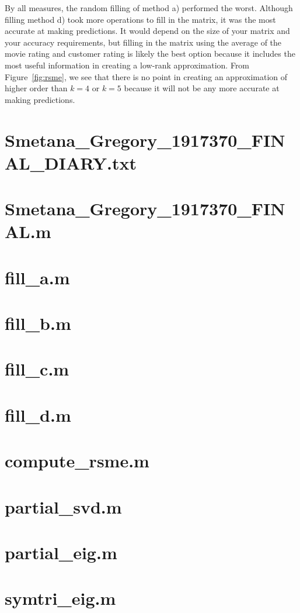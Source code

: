 \documentclass[11pt]{article} %
\begin{document}
By all measures, the random filling of method a) performed the worst. Although filling method d) took more operations to fill in the matrix, it was the most accurate at making predictions. It would depend on the size of your matrix and your accuracy requirements, but filling in the matrix using the average of the movie rating and customer rating is likely the best option because it includes the most useful information in creating a low-rank approximation. From Figure~\ref{fig:rsme}, we see that there is no point in creating an approximation of higher order than $k=4$ or $k=5$ because it will not be any more accurate at making predictions.

\clearpage
\appendix


\section{Smetana\_Gregory\_1917370\_FINAL\_DIARY.txt}


\section{Smetana\_Gregory\_1917370\_FINAL.m}


\section{fill\_a.m}


\section{fill\_b.m}


\section{fill\_c.m}


\section{fill\_d.m}


\section{compute\_rsme.m}


\section{partial\_svd.m}


\section{partial\_eig.m}


\section{symtri\_eig.m}


%
\end{document}
